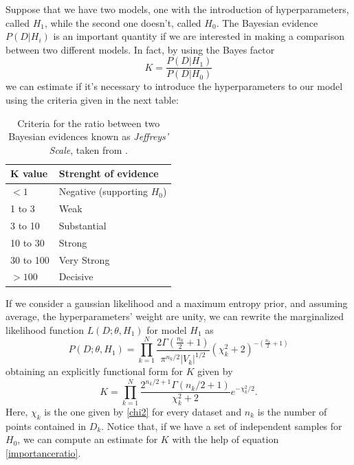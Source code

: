 \documentclass[onecolumn,           %
               showpacs,            %
               preprintnumbers,     %
               aps,                 %
               letterpaper,             %
               superscriptaddress,      %
               nofootinbib,         %
               tightenlines,        %
               floats,floatfix      %
               ,usenatbib,
               ]{revtex4-1}
\begin{document}
Suppose that we have two models, one with the introduction of hyperparameters, called $H_1$, while the second one doesn't, called $H_0$. The Bayesian evidence $P(D|H_i)$ is an important quantity if we are interested in making a comparison between two different models. In fact, by using the Bayes factor
\begin{equation}
K=\frac{P(D|H_1)}{P(D|H_0)}
\end{equation}
we can estimate if it's necessary to introduce the hyperparameters to our model using the criteria given in the next table:
\begin{table}[h!]
\centering
\begin{tabular}{||l|l||} 
 \hline
 \textbf{K value} & \textbf{Strenght of evidence} \\ [0.5ex] 
 \hline\hline
 $<1$  & Negative (supporting $H_0$)   \\ 
 \hline
 1 to 3 & Weak \\
 \hline 
3 to 10 & Substantial\\
\hline
10 to 30 & Strong\\
\hline
30 to 100 & Very Strong \\
\hline
$>100$ & Decisive\\ [1ex] 
 \hline
\end{tabular}
\caption{Criteria for the ratio between two Bayesian evidences known as \textit{Jeffreys' Scale}, taken from \cite{hiperp2}.}
\label{evidence}
\end{table}

If we consider a gaussian likelihood and a maximum entropy prior, and assuming average, the hyperparameters' weight are unity, we can rewrite the marginalized likelihood function $L(D;\theta,H_1)$ for model $H_1$ as
\begin{equation}
P(D;\theta,H_1)=\prod_{k=1}^N\frac{2\Gamma(\frac{n_k}{2}+1)}{\pi^{n_k/2}|V_k|^{1/2}}(\chi_k^2+2)^{-\left(\frac{n_k}{2}+1\right)}
\end{equation}
obtaining an explicitly functional form for $K$ given by
\begin{equation}
K=\prod_{k=1}^N\frac{2^{n_k/2+1}\Gamma(n_k/2+1)}{\chi^2_k+2}e^{-\chi_k^2/2}.
\end{equation}
Here, $\chi_k$ is the one given by \ref{chi2} for every dataset and $n_k$ is the number of points contained in $D_k$. Notice that, if we have a set of independent samples for $H_0$, we can compute an estimate for $K$ with the help of equation \eqref{importanceratio}. 
\end{document}
